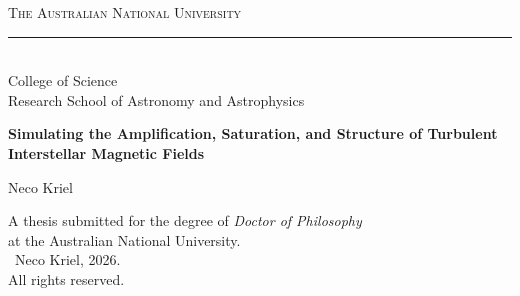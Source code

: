 \begin{titlepage}
        \centering
        
        {\Large\scshape The Australian National University}\\[-0.3cm]
        \rule{0.85\linewidth}{0.3pt}\\
        {\large College of Science}\\
        {\large Research School of Astronomy and Astrophysics}\\
        
        \vspace{5.0cm}
    
        {\Large\bfseries Simulating the Amplification, Saturation, and Structure of Turbulent Interstellar Magnetic Fields}
    
        \vspace{1.0cm}
        
        {\LARGE Neco Kriel}
        
        \vfill
        
        {A thesis submitted for the degree of \textit{Doctor of Philosophy}}\\[-0.2cm]
        {at the Australian National University.}\\
        {\textcopyright\ Neco Kriel, 2026.}\\[-0.2cm]
        {All rights reserved.}
\end{titlepage}
